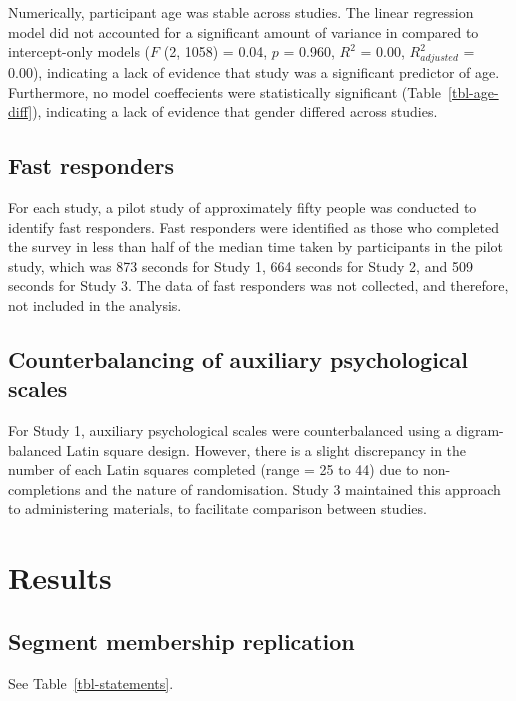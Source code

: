 \documentclass[
  letterpaper,
  DIV=11,
  numbers=noendperiod]{scrartcl}
\begin{document}
Numerically, participant age was stable across studies. The linear
regression model did not accounted for a significant amount of variance
in compared to intercept-only models (\(F\) (2, 1058) = 0.04, \(p\) =
0.960, \(R^2\) = 0.00, \(R^2_{adjusted}\) = 0.00), indicating a lack of
evidence that study was a significant predictor of age. Furthermore, no
model coeffecients were statistically significant
(Table~\ref{tbl-age-diff}), indicating a lack of evidence that gender
differed across studies.

\subsection{Fast responders}\label{fast-responders}

For each study, a pilot study of approximately fifty people was
conducted to identify fast responders. Fast responders were identified
as those who completed the survey in less than half of the median time
taken by participants in the pilot study, which was 873 seconds for
Study 1, 664 seconds for Study 2, and 509 seconds for Study 3. The data
of fast responders was not collected, and therefore, not included in the
analysis.

\subsection{Counterbalancing of auxiliary psychological
scales}\label{counterbalancing-of-auxiliary-psychological-scales}

For Study 1, auxiliary psychological scales were counterbalanced using a
digram-balanced Latin square design. However, there is a slight
discrepancy in the number of each Latin squares completed (range = 25 to
44) due to non-completions and the nature of randomisation. Study 3
maintained this approach to administering materials, to facilitate
comparison between studies.

\clearpage

\section{Results}\label{results}

\subsection{Segment membership
replication}\label{segment-membership-replication}

See Table~\ref{tbl-statements}.
\end{document}
